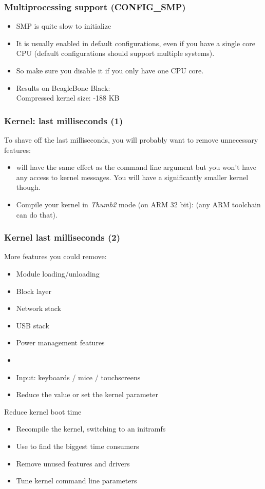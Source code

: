\begin{frame}
  \frametitle{Multiprocessing support (CONFIG\_SMP)}
  \begin{itemize}
          \item SMP is quite slow to initialize
          \item It is usually enabled in default configurations, even if
                you have a single core CPU (default configurations
                should support multiple systems).
          \item So make sure you disable it if you only have one CPU
                core.
          \item Results on BeagleBone Black:\\
                Compressed kernel size: -188 KB
  \end{itemize}
\end{frame}


\begin{frame}
\frametitle{Kernel: last milliseconds (1)}
To shave off the last milliseconds, you will probably want to remove
unnecessary features:
\begin{itemize}
        \item {} will have the same effect as the
               command line argument but you won't have
	      any access to kernel messages. You will have a
              significantly smaller kernel though.
	\item Compile your kernel in {\em Thumb2} mode (on ARM 32 bit):
	       (any ARM toolchain can do
	      that).
\end{itemize}
\end{frame}

\begin{frame}
\frametitle{Kernel last milliseconds (2)}
More features you could remove:
\begin{itemize}
        \item Module loading/unloading
        \item Block layer
        \item Network stack
        \item USB stack
        \item Power management features
        \item {}
        \item Input: keyboards / mice / touchscreens
        \item Reduce the  value or set the
               kernel parameter
\end{itemize}
\end{frame}

\setuplabframe
{Reduce kernel boot time}
{
\begin{itemize}
\item Recompile the kernel, switching to an initramfs
\item Use  to find the biggest
      time consumers
\item Remove unused features and drivers
\item Tune kernel command line parameters
\end{itemize}
}

